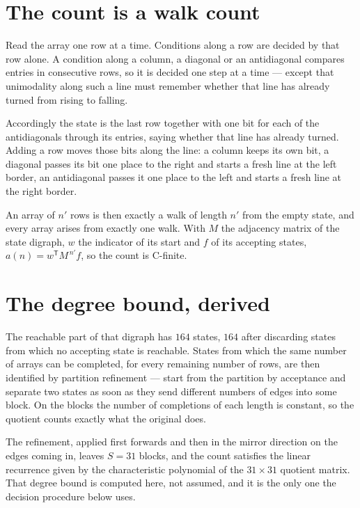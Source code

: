 \documentclass[11pt]{article}
\theoremstyle{definition}
\begin{document}
\section{The count is a walk count}

Read the array one row at a time. Conditions along a row are decided by that row alone. A condition along a column, a diagonal or an antidiagonal compares entries in consecutive rows, so it is decided one step at a time --- except that unimodality along such a line must remember whether that line has already turned from rising to falling.

Accordingly the state is the last row together with one bit for each of the antidiagonals through its entries, saying whether that line has already turned. Adding a row moves those bits along the line: a column keeps its own bit, a diagonal passes its bit one place to the right and starts a fresh line at the left border, an antidiagonal passes it one place to the left and starts a fresh line at the right border.

An array of $n'$ rows is then exactly a walk of length $n'$ from the empty state, and every array arises from exactly one walk. With $M$ the adjacency matrix of the state digraph, $w$ the indicator of its start and $f$ of its accepting states, $a(n) = w^{\mathsf T}M^{\,n'}f$, so the count is C-finite.

\section{The degree bound, derived}

The reachable part of that digraph has $164$ states, $164$ after discarding states from which no accepting state is reachable. States from which the same number of arrays can be completed, for every remaining number of rows, are then identified by partition refinement --- start from the partition by acceptance and separate two states as soon as they send different numbers of edges into some block. On the blocks the number of completions of each length is constant, so the quotient counts exactly what the original does.

The refinement, applied first forwards and then in the mirror direction on the edges coming in, leaves $S = 31$ blocks, and the count satisfies the linear recurrence given by the characteristic polynomial of the $31 \times 31$ quotient matrix. That degree bound is computed here, not assumed, and it is the only one the decision procedure below uses.
\end{document}
